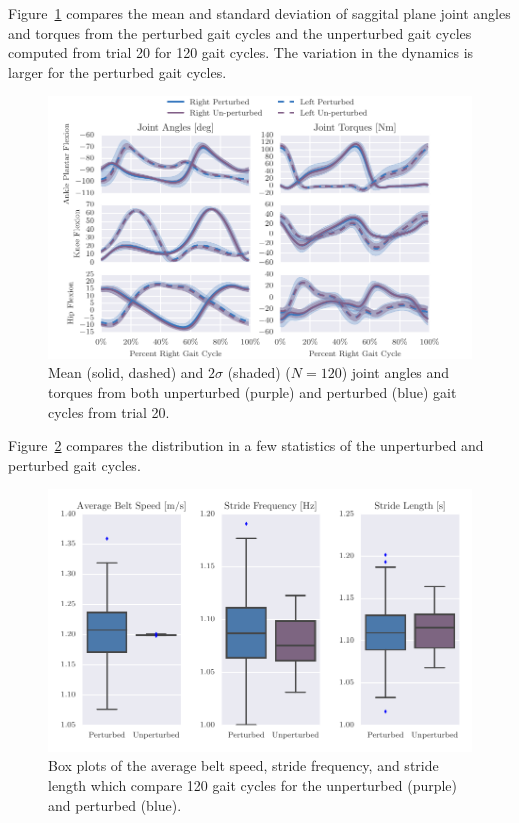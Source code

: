 \documentclass{article}
\begin{document}
Figure~\ref{fig:angle-torque-comparison} compares the mean and standard
deviation of saggital plane joint angles and torques from the perturbed gait
cycles and the unperturbed gait cycles computed from trial 20 for 120 gait
cycles. The variation in the dynamics is larger for the perturbed gait cycles.

\begin{figure}
  \includegraphics{figures/unperturbed-perturbed-comparison.pdf}
  \caption{Mean (solid, dashed) and $2\sigma$ (shaded) ($N=120$) joint angles
    and torques from both unperturbed (purple) and perturbed (blue) gait cycles
    from trial 20.}
  \label{fig:angle-torque-comparison}
\end{figure}

Figure~\ref{fig:gait-cycle-stats-comparison} compares the distribution in a few
statistics of the unperturbed and perturbed gait cycles.

\begin{figure}
  \includegraphics{figures/unperturbed-perturbed-boxplot-comparison.pdf}
  \caption{Box plots of the average belt speed, stride frequency, and stride
    length which compare 120 gait cycles for the unperturbed (purple) and
    perturbed (blue).}
  \label{fig:gait-cycle-stats-comparison}
\end{figure}
\end{document}
